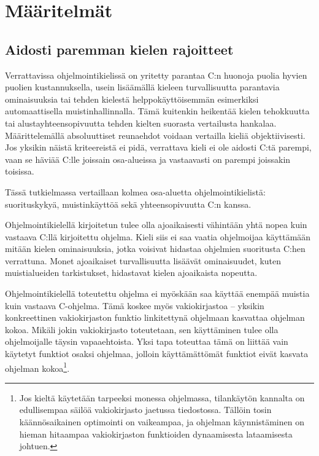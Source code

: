 \section{Määritelmät} 

\subsection{Aidosti paremman kielen rajoitteet}
\label{sec:abs}

Verrattavissa ohjelmointikielissä on yritetty parantaa C:n huonoja puolia
hyvien puolien kustannuksella, usein lisäämällä kieleen turvallisuutta
parantavia ominaisuuksia tai tehden kielestä helppokäyttöisemmän esimerkiksi
automaattisella muistinhallinnalla. Tämä kuitenkin heikentää kielen tehokkuutta
tai alustayhteensopivuutta tehden kielten suorasta vertailusta hankalaa. 
Määrittelemällä absoluuttiset reunaehdot voidaan vertailla kieliä
objektiivisesti. Jos yksikin näistä kriteereistä ei pidä, verrattava kieli ei
ole aidosti C:tä parempi, vaan se häviää C:lle joissain osa-alueissa ja
vastaavasti on parempi joissakin toisissa.

Tässä tutkielmassa vertaillaan kolmea osa-aluetta ohjelmointikielistä:
suorituskykyä, muistinkäyttöä sekä yhteensopivuutta C:n kanssa.

Ohjelmointikielellä kirjoitetun tulee olla ajoaikaisesti vähintään yhtä nopea
kuin vastaava C:llä kirjoitettu ohjelma. Kieli siis ei saa vaatia ohjelmoijaa
käyttämään mitään kielen ominaisuuksia, jotka voisivat hidastaa ohjelmien
suoritusta C:hen verrattuna. Monet ajoaikaiset turvallisuutta lisäävät
ominaisuudet, kuten muistialueiden tarkistukset, hidastavat kielen ajoaikaista
nopeutta.

Ohjelmointikielellä toteutettu ohjelma ei myöskään saa käyttää enempää muistia
kuin vastaava C-ohjelma. Tämä koskee myös vakiokirjastoa -- yksikin konkreettinen vakiokirjaston funktio linkitettynä ohjelmaan
kasvattaa ohjelman kokoa. Mikäli jokin vakiokirjasto toteutetaan, sen
käyttäminen tulee olla ohjelmoijalle täysin vapaaehtoista. Yksi tapa toteuttaa
tämä on liittää vain käytetyt funktiot osaksi ohjelmaa, jolloin käyttämättömät
funktiot eivät kasvata ohjelman kokoa\footnote{Jos kieltä käytetään tarpeeksi
monessa ohjelmassa, tilankäytön kannalta on edullisempaa säilöä vakiokirjasto
jaetussa tiedostossa. Tällöin tosin käännösaikainen optimointi on vaikeampaa,
ja ohjelman käynnistäminen on hieman hitaampaa vakiokirjaston funktioiden
dynaamisesta lataamisesta johtuen.}.

